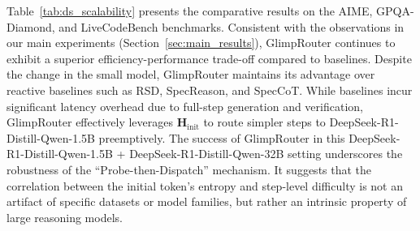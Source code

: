 \documentclass[11pt]{article}
\newcommand{\todoc}[2]{{\textcolor{#1}{{[#2]}}}}
\newcommand{\todoyellow}[1]{\todoc{yellow!85!black}{\textbf{#1}}}
\newcommand{\zhang}[1]{\todoyellow{Zhang: #1}}
\newcommand{\approach}{{GlimpRouter}\xspace}
\begin{document}
Table~\ref{tab:ds_scalability} presents the comparative results on the AIME, GPQA-Diamond, and LiveCodeBench benchmarks. 
Consistent with the observations in our main experiments (Section~\ref{sec:main_results}), \approach continues to exhibit a superior efficiency-performance trade-off compared to baselines.
Despite the change in the small model, \approach maintains its advantage over reactive baselines such as RSD, SpecReason, and SpecCoT.
While baselines incur significant latency overhead due to full-step generation and verification, \approach effectively leverages $\mathbf{H}_\text{init}$ to route simpler steps to DeepSeek-R1-Distill-Qwen-1.5B preemptively.
The success of \approach in this DeepSeek-R1-Distill-Qwen-1.5B + DeepSeek-R1-Distill-Qwen-32B setting underscores the robustness of the ``Probe-then-Dispatch'' mechanism. It suggests that the correlation between the initial token's entropy and step-level difficulty is not an artifact of specific datasets or model families, but rather an intrinsic property of large reasoning models. 





\end{document}
